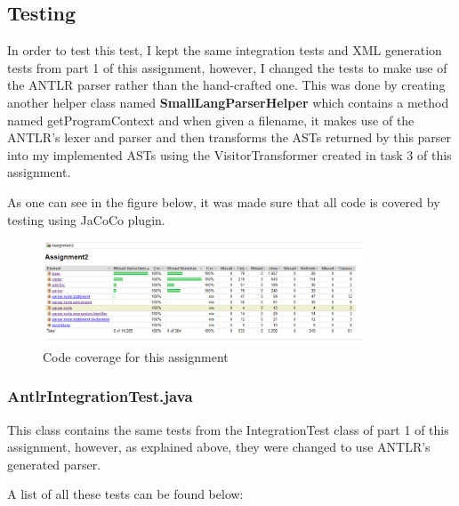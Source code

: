 \documentclass{article}
\begin{document}
				
				\subsection{Testing}
				
				In order to test this test, I kept the same integration tests and XML generation tests from part 1 of this assignment, however, I changed the tests to make use of the ANTLR parser rather than the hand-crafted one. This was done by creating another helper class named \textbf{SmallLangParserHelper} which contains a method named getProgramContext and when given a filename, it makes use of the ANTLR's lexer and parser and then transforms the ASTs returned by this parser into my implemented ASTs using the VisitorTransformer created in task 3 of this assignment.
				
				As one can see in the figure below, it was made sure that all code is covered by testing using JaCoCo plugin.
				
										\begin{figure}[H]
					\centering
			 			\includegraphics[width=0.85\textwidth]{jacoco2.png}
			  			\caption{Code coverage for this assignment}
			  			\label{fig:jacoco}
					\end{figure}
					
					\subsubsection{AntlrIntegrationTest.java}
					
					This class contains the same tests from the IntegrationTest class of part 1 of this assignment, however, as explained above, they were changed to use ANTLR's generated parser.
					
					A list of all these tests can be found below:
					
\end{document}
